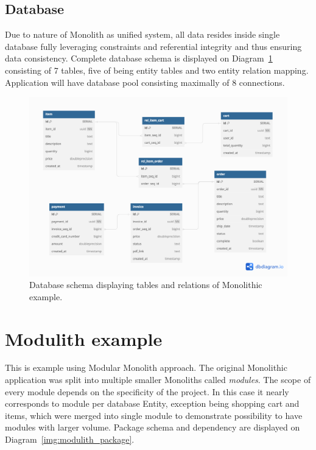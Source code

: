 \subsection{Database}
Due to nature of Monolith as unified system, all data resides inside single database fully leveraging constraints and referential integrity and thus ensuring data consistency. Complete database schema is displayed on Diagram~\ref{img:monolith_db_schema} consisting of 7 tables, five of being entity tables and two entity relation mapping. Application will have database pool consisting maximally of 8 connections.

\begin{figure}
    \centering
    \includegraphics[width=\textwidth]{images/monolith_db_schema.png}
    \caption{Database schema displaying tables and relations of Monolithic example. \label{img:monolith_db_schema}}
\end{figure}



\section{Modulith example}
This is example using Modular Monolith approach. The original Monolithic application was split into multiple smaller Monoliths called \textit{modules}. The scope of every module depends on the specificity of the project. In this case it nearly corresponds to module per database Entity, exception being shopping cart and items, which were merged into single module to demonstrate possibility to have modules with larger volume. Package schema and dependency are displayed on Diagram~\ref{img:modulith_package}.

